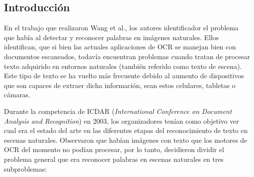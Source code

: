 \subsection{Introducción}

	En el trabajo que realizaron Wang et al., los autores identificador el problema que había al detectar y reconocer palabras en imágenes naturales. Ellos identifican, que si bien las actuales aplicaciones de OCR se manejan bien con documentos escaneados, todavía encuentran problemas cuando tratan de procesar texto adquirido en entornos naturales (también referido como texto de escena). Este tipo de texto se ha vuelto más frecuente debido al aumento de dispositivos que son capaces de extraer dicha información, sean estos celulares, tabletas o cámaras.
	
	Durante la competencia de ICDAR (\textit{International Conference on Document Analysis and Recognition}) en 2003, los organizadores tenían como objetivo ver cual era el estado del arte en las diferentes etapas del reconocimiento de texto en escenas naturales. Observaron que habían imágenes con texto que los motores de OCR del momento no podían procesar, por lo tanto, decidieron dividir el problema general que era reconocer palabras en escenas naturales en tres subproblemas:
	
